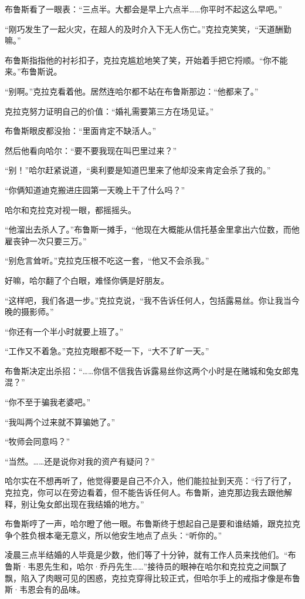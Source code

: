 \documentclass[../main]{subfiles}
\begin{document}
布鲁斯看了一眼表：“三点半。大都会是早上六点半……你平时不起这么早吧。”

“刚巧发生了一起火灾，在超人的及时介入下无人伤亡。”克拉克笑笑，“天道酬勤嘛。”

布鲁斯指指他的衬衫扣子，克拉克尴尬地笑了笑，开始着手把它捋顺。“你不能来。”布鲁斯说。

“别啊。”克拉克看着他。居然连哈尔都不站在布鲁斯那边：“他都来了。”

克拉克努力证明自己的价值：“婚礼需要第三方在场见证。”

布鲁斯眼皮都没抬：“里面肯定不缺活人。”

然后他看向哈尔：“要不要我现在叫巴里过来？”

“别！”哈尔赶紧说道，“奥利要是知道巴里来了他却没来肯定会杀了我的。”

“你俩知道迪克搬进庄园第一天晚上干了什么吗？”

哈尔和克拉克对视一眼，都摇摇头。

“他溜出去杀人了。”布鲁斯一摊手，“他现在大概能从信托基金里拿出六位数，而他雇丧钟一次只要三万。”

“别危言耸听。”克拉克压根不吃这一套，“他又不会杀我。”

好嘛，哈尔翻了个白眼，难怪你俩是好朋友。

“这样吧，我们各退一步。”克拉克说，“我不告诉任何人，包括露易丝。你让我当今晚的摄影师。”

“你还有一个半小时就要上班了。”

“工作又不着急。”克拉克眼都不眨一下，“大不了旷一天。”

布鲁斯决定出杀招：“……你信不信我告诉露易丝你这两个小时是在赌城和兔女郎鬼混？”

“你不至于骗我老婆吧。”

“我叫两个过来就不算骗她了。”

“牧师会同意吗？”

“当然。……还是说你对我的资产有疑问？”

哈尔实在不想再听了，他觉得要是自己不介入，他们能拉扯到天亮：“行了行了，克拉克，你可以在旁边看着，但不能告诉任何人。布鲁斯，迪克那边我去跟他解释，别让兔女郎出现在我结婚的地方。”

布鲁斯哼了一声，哈尔瞪了他一眼。布鲁斯终于想起自己是要和谁结婚，跟克拉克争个胜负根本毫无意义，所以他安生地点了点头：“听你的。”

凌晨三点半结婚的人毕竟是少数，他们等了十分钟，就有工作人员来找他们。“布鲁斯·韦恩先生和，哈尔·乔丹先生\ldots\ldots”接待员的眼神在哈尔和克拉克之间飘了飘，陷入了肉眼可见的困惑，克拉克穿得比较正式，但哈尔手上的戒指才像是布鲁斯·韦恩会有的品味。
\end{document}
